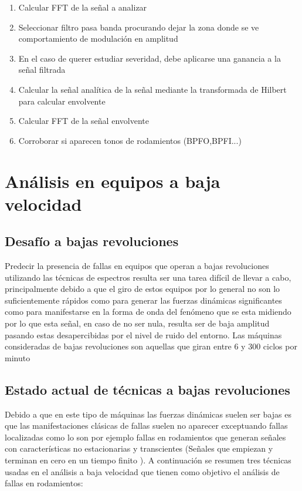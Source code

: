 		\begin{enumerate}
			\item {Calcular FFT de la señal a analizar}
			\item Seleccionar filtro pasa banda procurando dejar la zona donde se ve comportamiento de modulación en amplitud
			\item En el caso de querer estudiar severidad, debe aplicarse una ganancia a la señal filtrada
			\item Calcular la señal analítica de la señal mediante la transformada de Hilbert para calcular envolvente
			\item Calcular FFT de la señal envolvente
			\item Corroborar si aparecen tonos de rodamientos (BPFO,BPFI...) 
		\end{enumerate}
		
		\section{Análisis en equipos a baja velocidad}
			\subsection{Desafío a bajas revoluciones}
			    Predecir la presencia de fallas en equipos que operan a bajas revoluciones utilizando las técnicas de espectros resulta ser una tarea difícil de llevar a cabo, principalmente debido a que el giro de estos equipos por lo general no son lo suficientemente rápidos como para generar las fuerzas dinámicas significantes como para manifestarse en la forma de onda del fenómeno que se esta midiendo por lo que esta señal, en caso de no ser nula, resulta ser de baja amplitud pasando estas desapercibidas por el nivel de ruido del entorno. Las máquinas consideradas de bajas revoluciones son aquellas que giran entre 6 y 300 ciclos por minuto \cite{robinsonjc}			
			\subsection{Estado actual de técnicas a bajas revoluciones}
			    Debido a que en este tipo de máquinas las fuerzas dinámicas suelen ser bajas es que las manifestaciones clásicas de fallas suelen no aparecer exceptuando fallas localizadas como lo son por ejemplo fallas en rodamientos que generan señales con características no estacionarias y transcientes (Señales que empiezan y terminan en cero en un tiempo finito \cite{dlinonstationary}). A continuación se resumen tres técnicas usadas en el análisis a baja velocidad que tienen como objetivo el análisis de fallas en rodamientos:
